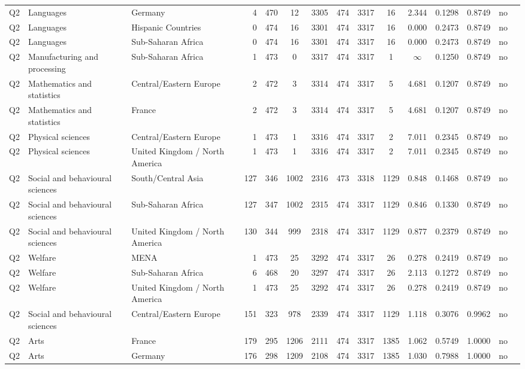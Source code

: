 \begin{longtable}{lllrcccccccccll}
Q2 & Languages & Germany & 4 & 470 & 12 & 3305 & 474 & 3317 & 16 & 2.344 & 0.1298 & 0.8749 & no \\
Q2 & Languages & Hispanic Countries & 0 & 474 & 16 & 3301 & 474 & 3317 & 16 & 0.000 & 0.2473 & 0.8749 & no \\
Q2 & Languages & Sub-Saharan Africa & 0 & 474 & 16 & 3301 & 474 & 3317 & 16 & 0.000 & 0.2473 & 0.8749 & no \\
Q2 & Manufacturing and processing & Sub-Saharan Africa & 1 & 473 & 0 & 3317 & 474 & 3317 & 1 & $\infty$ & 0.1250 & 0.8749 & no \\
Q2 & Mathematics and statistics & Central/Eastern Europe & 2 & 472 & 3 & 3314 & 474 & 3317 & 5 & 4.681 & 0.1207 & 0.8749 & no \\
Q2 & Mathematics and statistics & France & 2 & 472 & 3 & 3314 & 474 & 3317 & 5 & 4.681 & 0.1207 & 0.8749 & no \\
Q2 & Physical sciences & Central/Eastern Europe & 1 & 473 & 1 & 3316 & 474 & 3317 & 2 & 7.011 & 0.2345 & 0.8749 & no \\
Q2 & Physical sciences & United Kingdom / North America & 1 & 473 & 1 & 3316 & 474 & 3317 & 2 & 7.011 & 0.2345 & 0.8749 & no \\
Q2 & Social and behavioural sciences & South/Central Asia & 127 & 346 & 1002 & 2316 & 473 & 3318 & 1129 & 0.848 & 0.1468 & 0.8749 & no \\
Q2 & Social and behavioural sciences & Sub-Saharan Africa & 127 & 347 & 1002 & 2315 & 474 & 3317 & 1129 & 0.846 & 0.1330 & 0.8749 & no \\
Q2 & Social and behavioural sciences & United Kingdom / North America & 130 & 344 & 999 & 2318 & 474 & 3317 & 1129 & 0.877 & 0.2379 & 0.8749 & no \\
Q2 & Welfare & MENA & 1 & 473 & 25 & 3292 & 474 & 3317 & 26 & 0.278 & 0.2419 & 0.8749 & no \\
Q2 & Welfare & Sub-Saharan Africa & 6 & 468 & 20 & 3297 & 474 & 3317 & 26 & 2.113 & 0.1272 & 0.8749 & no \\
Q2 & Welfare & United Kingdom / North America & 1 & 473 & 25 & 3292 & 474 & 3317 & 26 & 0.278 & 0.2419 & 0.8749 & no \\
Q2 & Social and behavioural sciences & Central/Eastern Europe & 151 & 323 & 978 & 2339 & 474 & 3317 & 1129 & 1.118 & 0.3076 & 0.9962 & no \\
Q2 & Arts & France & 179 & 295 & 1206 & 2111 & 474 & 3317 & 1385 & 1.062 & 0.5749 & 1.0000 & no \\
Q2 & Arts & Germany & 176 & 298 & 1209 & 2108 & 474 & 3317 & 1385 & 1.030 & 0.7988 & 1.0000 & no \\

\end{longtable}
